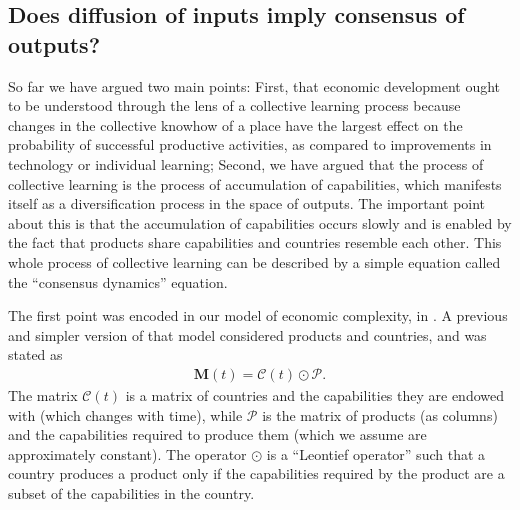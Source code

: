 \documentclass[12pt]{article}
\newcommand{\mtx}[1]{\mathbf{ #1}}
\begin{document}
\subsection{Does diffusion of inputs imply consensus of outputs?}
So far we have argued two main points: First, that economic development ought to be understood through the lens of a collective learning process because changes in the collective knowhow of a place have the largest effect on the probability of successful productive activities, as compared to improvements in technology or individual learning; Second, we have argued that the process of collective learning is the process of accumulation of capabilities, which manifests itself as a diversification process in the space of outputs. The important point about this is that the accumulation of capabilities occurs slowly and is enabled by the fact that products share capabilities and countries resemble each other. This whole process of collective learning can be described by a simple equation called the ``consensus dynamics'' equation. 

The first point was encoded in our model of economic complexity, in . A previous and simpler version of that model \citep{HidalgoHausmann2009,HausmannHidalgo2011} considered products and countries, and was stated as
\begin{align}
	\mtx{M}(t) = \mtx{{\mathcal C}}(t)\odot \mtx{{\mathcal P}}.
\label{eq_CcaPpa}
\end{align}
The matrix $\mtx{{\mathcal C}}(t)$ is a matrix of countries and the capabilities they are endowed with (which changes with time), while $\mtx{{\mathcal P}}$ is the matrix of products (as columns) and the capabilities required to produce them (which we assume are approximately constant). The operator $\odot$ is a ``Leontief operator'' such that a country produces a product only if the capabilities required by the product are a subset of the capabilities in the country.
\end{document}
